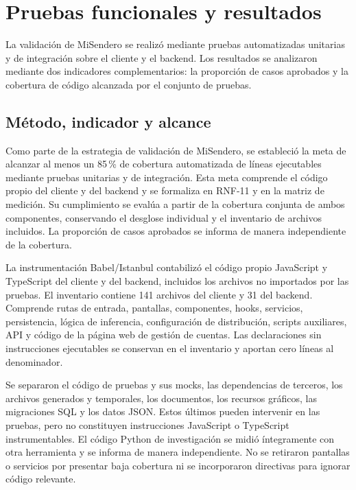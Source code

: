 \section{Pruebas funcionales y resultados}\label{sec:pruebas-funcionales}

La validación de MiSendero se realizó mediante pruebas automatizadas unitarias y de integración sobre el cliente y el backend. Los resultados se analizaron mediante dos indicadores complementarios: la proporción de casos aprobados y la cobertura de código alcanzada por el conjunto de pruebas.

\subsection{Método, indicador y alcance}

Como parte de la estrategia de validación de MiSendero, se estableció la meta de alcanzar al menos un 85\,\% de cobertura automatizada de líneas ejecutables mediante pruebas unitarias y de integración. Esta meta comprende el código propio del cliente y del backend y se formaliza en RNF-11 y en la matriz de medición. Su cumplimiento se evalúa a partir de la cobertura conjunta de ambos componentes, conservando el desglose individual y el inventario de archivos incluidos. La proporción de casos aprobados se informa de manera independiente de la cobertura.

La instrumentación Babel/Istanbul contabilizó el código propio JavaScript y TypeScript del cliente y del backend, incluidos los archivos no importados por las pruebas. El inventario contiene 141 archivos del cliente y 31 del backend. Comprende rutas de entrada, pantallas, componentes, hooks, servicios, persistencia, lógica de inferencia, configuración de distribución, scripts auxiliares, API y código de la página web de gestión de cuentas. Las declaraciones sin instrucciones ejecutables se conservan en el inventario y aportan cero líneas al denominador.

Se separaron el código de pruebas y sus mocks, las dependencias de terceros, los archivos generados y temporales, los documentos, los recursos gráficos, las migraciones SQL y los datos JSON. Estos últimos pueden intervenir en las pruebas, pero no constituyen instrucciones JavaScript o TypeScript instrumentables. El código Python de investigación se midió íntegramente con otra herramienta y se informa de manera independiente. No se retiraron pantallas o servicios por presentar baja cobertura ni se incorporaron directivas para ignorar código relevante.

